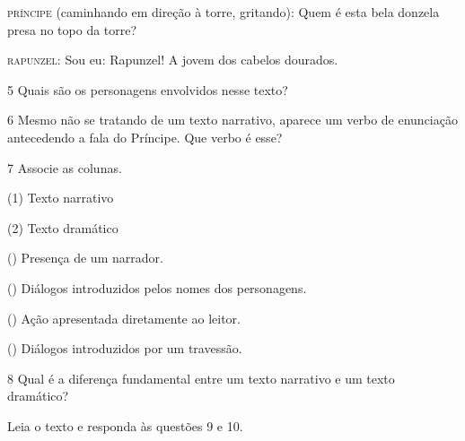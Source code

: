 \begin{myquote}
\textsc{príncipe} (caminhando em direção à torre, gritando): Quem é esta bela
donzela presa no topo da torre?

\noindent\textsc{rapunzel}: Sou eu: Rapunzel! A jovem dos cabelos dourados.

\end{myquote}

\num{5} Quais são os personagens envolvidos nesse texto?


\num{6} Mesmo não se tratando de um texto narrativo, aparece um verbo de enunciação antecedendo a fala do Príncipe. Que verbo é esse?


\num{7} Associe as colunas.

{\setlength{\columnsep}{-6.5cm}
\begin{multicols}{2}
(1) Texto narrativo

(2) Texto dramático

\columnbreak

({}) Presença de um narrador.

({}) Diálogos introduzidos pelos nomes dos personagens.

({}) Ação apresentada diretamente ao leitor.

({}) Diálogos introduzidos por um travessão.
\end{multicols}
}

\num{8} Qual é a diferença fundamental entre um texto narrativo e um texto dramático?


\pagebreak

Leia o texto e responda às questões 9 e 10.\bigskip\bigskip

